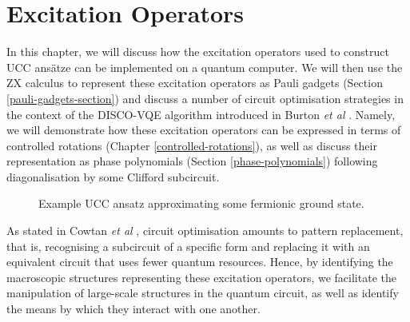 \chapter{Excitation Operators}%
\label{excitation-operators}

In this chapter, we will discuss how the excitation operators used to construct UCC ansätze can be implemented on a quantum computer. We will then use the ZX calculus to represent these excitation operators as Pauli gadgets (Section \ref{pauli-gadgets-section}) and discuss a number of circuit optimisation strategies in the context of the DISCO-VQE algorithm introduced in Burton \textit{et al} \cite{Burton2023}. Namely, we will demonstrate how these excitation operators can be expressed in terms of controlled rotations (Chapter \ref{controlled-rotations}), as well as discuss their representation as phase polynomials (Section \ref{phase-polynomials}) following diagonalisation by some Clifford subcircuit. 

\begin{figure}[H]
    \centering
    \caption{Example UCC ansatz approximating some fermionic ground state.}
\end{figure}

As stated in Cowtan \textit{et al} \cite{Cowtan2020}, circuit optimisation amounts to pattern replacement, that is, recognising a subcircuit of a specific form and replacing it with an equivalent circuit that uses fewer quantum resources. Hence, by identifying the macroscopic structures representing these excitation operators, we facilitate the manipulation of large-scale structures in the quantum circuit, as well as identify the means by which they interact with one another.
